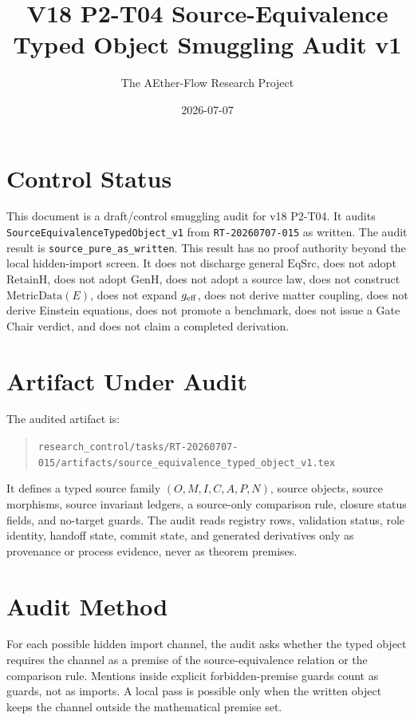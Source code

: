 \documentclass[11pt]{article}
\title{V18 P2-T04 Source-Equivalence Typed Object Smuggling Audit v1}
\author{The AEther-Flow Research Project}
\date{2026-07-07}
\newcommand{\EqSrc}{\mathrm{EqSrc}}
\newcommand{\RetainH}{\mathrm{RetainH}}
\newcommand{\GenH}{\mathrm{GenH}}
\begin{document}
\maketitle

\section*{Control Status}

This document is a draft/control smuggling audit for v18 P2-T04. It audits
\texttt{SourceEquivalenceTypedObject\_v1} from
\texttt{RT-20260707-015} as written. The audit result is
\texttt{source\_pure\_as\_written}. This result has no proof authority beyond
the local hidden-import screen. It does not discharge general \(\EqSrc\), does
not adopt \(\RetainH\), does not adopt \(\GenH\), does not adopt a source law,
does not construct \(\mathrm{MetricData}(E)\), does not expand \(g_{\rm eff}\),
does not derive matter coupling, does not derive Einstein equations, does not
promote a benchmark, does not issue a Gate Chair verdict, and does not claim a
completed derivation.

\section*{Artifact Under Audit}

The audited artifact is:

\begin{quote}
\texttt{research\_control/tasks/RT-20260707-015/artifacts/source\_equivalence\_typed\_object\_v1.tex}
\end{quote}

It defines a typed source family \((O,M,I,C,A,P,N)\), source objects, source
morphisms, source invariant ledgers, a source-only comparison rule, closure
status fields, and no-target guards. The audit reads registry rows, validation
status, role identity, handoff state, commit state, and generated derivatives
only as provenance or process evidence, never as theorem premises.

\section*{Audit Method}

For each possible hidden import channel, the audit asks whether the typed
object requires the channel as a premise of the source-equivalence relation or
the comparison rule. Mentions inside explicit forbidden-premise guards count as
guards, not as imports. A local pass is possible only when the written object
keeps the channel outside the mathematical premise set.
\end{document}
